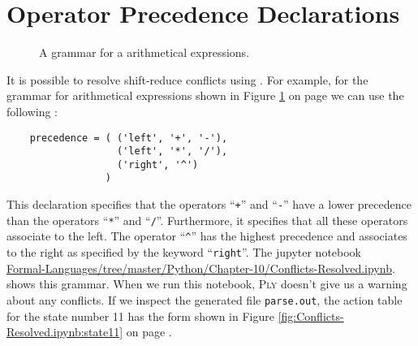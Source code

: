 \section{Operator Precedence Declarations \label{section:operator-precedence}}
\begin{figure}[!ht]

  \begin{center}    
  \end{center}
  \caption{A grammar for a arithmetical expressions.}
  \label{fig:grammar-resolved.g}
\end{figure}
It is possible to resolve shift-reduce conflicts using .
For example, for the grammar for arithmetical expressions shown in Figure \ref{fig:grammar-resolved.g}
on page \pageref{fig:grammar-resolved.g} we can use the following :
\begin{verbatim}
    precedence = ( ('left', '+', '-'),
                   ('left', '*', '/'),
                   ('right', '^')
                 )
\end{verbatim}
This declaration specifies that the operators ``\texttt{+}'' and ``\texttt{-}'' have a lower precedence than
the operators  ``\texttt{*}'' and ``\texttt{/}''.  Furthermore, it specifies that all these operators associate
to the left.  The operator ``\texttt{\^}'' has the highest precedence and associates to the right as specified
by the keyword ``\texttt{right}''.
The jupyter notebook
\\[0.2cm]
\hspace*{1.3cm}
\href{https://github.com/karlstroetmann/Formal-Languages/tree/master/Python/Chapter-10/Conflicts-Resolved.ipynb}{Formal-Languages/tree/master/Python/Chapter-10/Conflicts-Resolved.ipynb}.
\\[0.2cm]
shows this grammar.  When we run this notebook, \textsc{Ply} doesn't give us a
warning about any conflicts.  If we inspect the generated file \texttt{parse.out}, the action table for the
state number 11 has the form shown in Figure \ref{fig:Conflicts-Resolved.ipynb:state11} on page
\pageref{fig:Conflicts-Resolved.ipynb:state11}.

